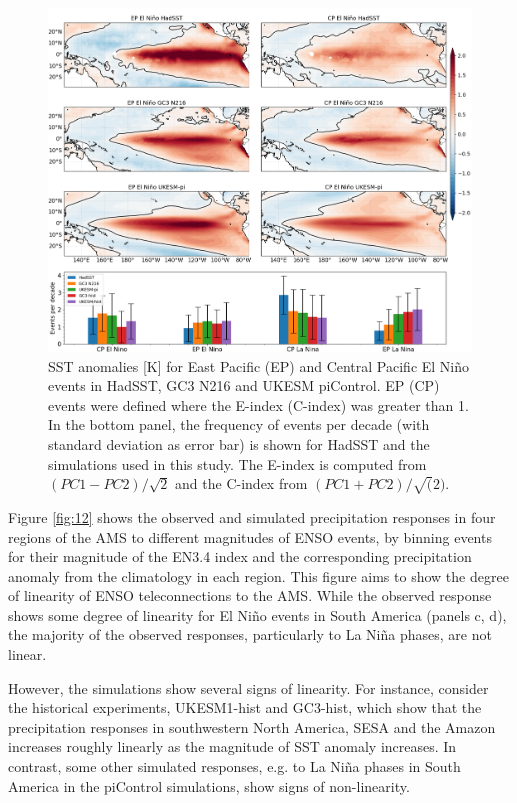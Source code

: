

\begin{figure}[b!]
\includegraphics[width=\linewidth]{figures/epcpmap}
\caption{SST anomalies [K] for East Pacific (EP) and Central Pacific El Niño events in HadSST, GC3 N216 and UKESM piControl. EP (CP) events were defined where the E-index (C-index) was greater than 1. In the bottom panel, the frequency of events per decade (with standard deviation as error bar) is shown for HadSST and the simulations used in this study.
The E-index is computed from $(PC1-PC2)/\sqrt{2}$ and the C-index from $(PC1+PC2)/\sqrt(2)$.
}
\label{fig:s1}
\end{figure}


 Figure \ref{fig:12} shows the observed and simulated precipitation responses in four regions of the AMS to different magnitudes of ENSO events, by binning events for their magnitude of the EN3.4 index and the corresponding precipitation anomaly from the climatology in each region. This figure aims to show  the degree of linearity of ENSO teleconnections to the AMS.
While the observed response shows some degree of linearity for El Ni\~no events in South America (panels c, d), the majority of the observed responses, particularly to La Ni\~na phases, are not linear.

 However, the simulations show several signs of linearity. For instance, consider the historical experiments, UKESM1-hist and GC3-hist, which show that the precipitation responses in southwestern North America, SESA and the Amazon increases roughly linearly as the magnitude of SST anomaly increases. In contrast, some other simulated responses, e.g. to La Ni\~na phases in South America in the piControl simulations, show signs of non-linearity.



